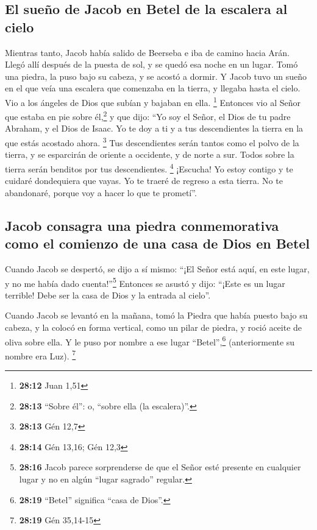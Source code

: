 \hypertarget{el-sueuxf1o-de-jacob-en-betel-de-la-escalera-al-cielo}{%
\subsection{El sueño de Jacob en Betel de la escalera al
cielo}\label{el-sueuxf1o-de-jacob-en-betel-de-la-escalera-al-cielo}}

 Mientras tanto, Jacob había salido de Beerseba e iba de
camino hacia Arán.  Llegó allí después de la puesta de
sol, y se quedó esa noche en un lugar. Tomó una piedra, la puso bajo su
cabeza, y se acostó a dormir.  Y Jacob tuvo un sueño en
el que veía una escalera que comenzaba en la tierra, y llegaba hasta el
cielo. Vio a los ángeles de Dios que subían y bajaban en ella.
\footnote{\textbf{28:12} Juan 1,51}  Entonces vio al
Señor que estaba en pie sobre él,\footnote{\textbf{28:13} ``Sobre él'':
  o, ``sobre ella (la escalera)''.} y que dijo: ``Yo soy el Señor, el
Dios de tu padre Abraham, y el Dios de Isaac. Yo te doy a ti y a tus
descendientes la tierra en la que estás acostado ahora. \footnote{\textbf{28:13}
  Gén 12,7}  Tus descendientes serán tantos como el polvo
de la tierra, y se esparcirán de oriente a occidente, y de norte a sur.
Todos sobre la tierra serán benditos por tus descendientes. \footnote{\textbf{28:14}
  Gén 13,16; Gén 12,3}  ¡Escucha! Yo estoy contigo y te
cuidaré dondequiera que vayas. Yo te traeré de regreso a esta tierra. No
te abandonaré, porque voy a hacer lo que te prometí''.

\hypertarget{jacob-consagra-una-piedra-conmemorativa-como-el-comienzo-de-una-casa-de-dios-en-betel}{%
\subsection{Jacob consagra una piedra conmemorativa como el comienzo de
una casa de Dios en
Betel}\label{jacob-consagra-una-piedra-conmemorativa-como-el-comienzo-de-una-casa-de-dios-en-betel}}

 Cuando Jacob se despertó, se dijo a sí mismo: ``¡El
Señor está aquí, en este lugar, y no me había dado cuenta!''\footnote{\textbf{28:16}
  Jacob parece sorprenderse de que el Señor esté presente en cualquier
  lugar y no en algún ``lugar sagrado'' regular.} 
Entonces se asustó y dijo: ``¡Este es un lugar terrible! Debe ser la
casa de Dios y la entrada al cielo''.

 Cuando Jacob se levantó en la mañana, tomó la Piedra que
había puesto bajo su cabeza, y la colocó en forma vertical, como un
pilar de piedra, y roció aceite de oliva sobre ella.  Y
le puso por nombre a ese lugar ``Betel'',\footnote{\textbf{28:19}
  ``Betel'' significa ``casa de Dios''.} (anteriormente su nombre era
Luz). \footnote{\textbf{28:19} Gén 35,14-15}

